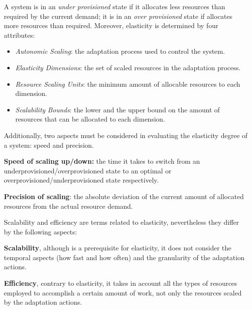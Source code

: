 A system is in an \textit{under provisioned} state if it allocates less resources than required by the current demand; it is in an \textit{over provisioned} state if allocates more resources than required. Moreover, elasticity is determined by four attributes:

\begin{itemize}
	\item \textit{Autonomic Scaling}: the adaptation process used to control the system.
	\item \textit{Elasticity Dimensions}: the set of scaled resources in the adaptation process.
	\item \textit{Resource Scaling Units}: the minimum amount of allocable resources to each dimension.
	\item \textit{Scalability Bounds}: the lower and the upper bound on the amount of resources that can be allocated to each dimension.
\end{itemize}

Additionally, two aspects must be considered in evaluating the elasticity degree of a system: speed and precision. 

\textbf{Speed of scaling up/down:} the time it takes to switch from an underprovisioned/overprovisioned state to an optimal or overprovisioned/underprovisioned state respectively. 

\textbf{Precision of scaling}: the absolute deviation of the current amount of allocated resources from the actual resource demand.

Scalability and efficiency are terms related to elasticity, nevertheless they differ by the following aspects:
 
\textbf{Scalability}, although is a prerequisite for elasticity, it does not consider the temporal aspects (how fast and how often) and the granularity of the adaptation actions.

\textbf{Efficiency}, contrary to elasticity, it takes in account all the types of resources employed to accomplish a certain amount of work, not only the resources scaled by the adaptation actions. 

